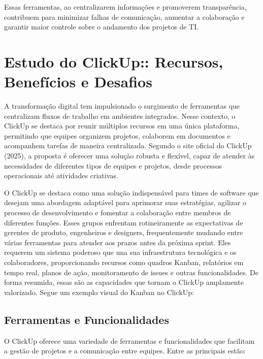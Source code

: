 \documentclass[12pt]{article}
\begin{document}
Essas ferramentas, ao centralizarem informações e promoverem transparência, contribuem para minimizar falhas de comunicação, aumentar a colaboração e garantir maior controle sobre o andamento dos projetos de TI.

\clearpage
\newpage

\section{Estudo do ClickUp:: Recursos, Benefícios e Desafios}
A transformação digital tem impulsionado o surgimento de ferramentas que centralizam fluxos de trabalho em ambientes integrados. Nesse contexto, o ClickUp se destaca por reunir múltiplos recursos em uma única plataforma, permitindo que equipes organizem projetos, colaborem em documentos e acompanhem tarefas de maneira centralizada. Segundo o site oficial do ClickUp (2025), a proposta é oferecer uma solução robusta e flexível, capaz de atender às necessidades de diferentes tipos de equipes e projetos, desde processos operacionais até atividades criativas.

O ClickUp se destaca como uma solução indispensável para times de software que desejam uma abordagem adaptável para aprimorar suas estratégias, agilizar o processo de desenvolvimento e fomentar a colaboração entre membros de diferentes funções. Esses grupos enfrentam rotineiramente as expectativas de gerentes de produto, engenheiros e designers, frequentemente mudando entre várias ferramentas para atender aos prazos antes da próxima sprint. Eles requerem um sistema poderoso que una sua infraestrutura tecnológica e os colaboradores, proporcionando recursos como quadros Kanban, relatórios em tempo real, planos de ação, monitoramento de issues e outras funcionalidades. De forma resumida, essas são as capacidades que tornam o ClickUp amplamente valorizado.
Segue um exemplo visual do Kanban no ClickUp:

\clearpage
\subsection{Ferramentas e Funcionalidades}
O ClickUp oferece uma variedade de ferramentas e funcionalidades que facilitam a gestão de projetos e a comunicação entre equipes. Entre as principais estão:
\end{document}
